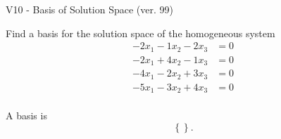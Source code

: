 \begin{exercise}
  \begin{exerciseTitle}V10 - Basis of Solution Space (ver. 99)\end{exerciseTitle}
  \begin{exerciseStatement}
    Find a basis for the solution space of the homogeneous system 
\begin{align*}
 -2 x_ 1 -1 x_ 2 -2 x_ 3 &= 0  \\ 
  -2 x_ 1 + 4 x_ 2 -1 x_ 3 &= 0  \\ 
  -4 x_ 1 -2 x_ 2 + 3 x_ 3 &= 0  \\ 
  -5 x_ 1 -3 x_ 2 + 4 x_ 3 &= 0  \\ 
 \end{align*}


 
  \end{exerciseStatement}

  \begin{exerciseAnswer}
   A basis is   
\[\left\{\right\}.\]

  


  \end{exerciseAnswer}
\end{exercise}